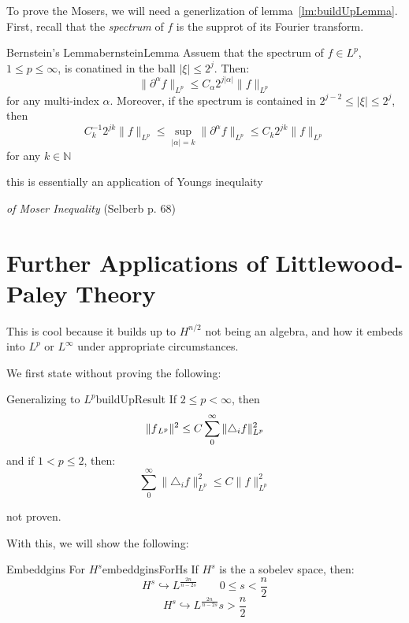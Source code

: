 \documentclass{book}
\newenvironment{Proof}[1][]
  {\begin{ProofTcb}[#1]}
  {\end{ProofTcb}}
\newcommand{\N}{{\mathbb{N}}}
\begin{document}
To prove the Mosers, we will need a generlization of lemma~\ref{lm:buildUpLemma}. First, recall that the
\emph{spectrum} of $f$ is the supprot of its Fourier transform.

\begin{lem}{Bernstein's Lemma}{bernsteinLemma}
	Assuem that the spectrum of $f \in L^p$, $1 \le p \le \infty$, is conatined in the ball $|\xi| \le
	2^j$. Then:
	\[
		\|  \partial^\alpha f\|_{L^p} \le C_\alpha 2^{j|\alpha|} \|f\|_{L^p}
	\]
	for any multi-index $\alpha$. Moreover, if the spectrum is contained in $2^{j-2} \le |\xi| \le 2^j$, then
	\[
		C_k^{-1} 2^{jk} \|f\|_{L^p} \le \sup_{|\alpha| = k} \|  \partial^\alpha f\|_{L^p} \le C_k
		2^{jk}\|f\|_{L^p}
	\]
	for any $k \in \N$
\end{lem}

\begin{Proof}
	this is essentially an application of Youngs inequlaity
\end{Proof}

\begin{Proof}
	\emph{of Moser Inequality} (Selberb p. 68)
\end{Proof}

\section{Further Applications of Littlewood-Paley Theory}

This is cool because it builds up to $H^{n/2}$ not being an algebra, and how it embeds into $L^p$ or $L^\infty$ under
appropriate circumstances.

We first state without proving the following:

\begin{thm}{Generalizing to $L^p$}{buildUpResult}
	If $ 2\le p < \infty$, then
	\[
		\|f\\_{L^p}\|^2 \le C\sum_0^\infty \|\triangle_i f\|^2_{L^p}
	\]
	and if $1 < p \le 2$, then:
	\[
		\sum_0^\infty \|\triangle_i f\|_{L^p}^2 \le C\|f\|_{L^p}^2
	\]
\end{thm}

\begin{Proof}
	not proven.
\end{Proof}

With this, we will show the following:

\begin{thm}{Embeddgins For $H^s$}{embeddginsForHs}
	If $H^s$ is the a sobelev space, then:
	\begin{equation}\label{eq:finiteSobelevEmb}
		H^s \hookrightarrow L^{\frac{2n}{n-2s}} \qquad 0 \le s <\frac{n}{2}
	\end{equation}
	\begin{equation}\label{eq:infiniteSobelevEmb}
		H^s \hookrightarrow L^{\frac{2n}{n-2s}} s > \frac{n}{2}
	\end{equation}
\end{thm}
\end{document}
